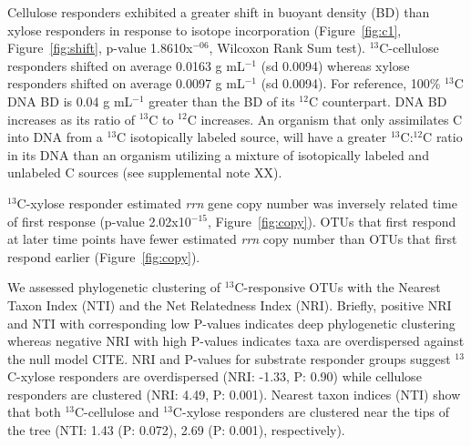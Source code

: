 Cellulose responders exhibited a greater shift in buoyant density (BD) than
xylose responders in response to isotope incorporation (Figure~\ref{fig:c1},
Figure~\ref{fig:shift}, p-value 1.8610x$^{-06}$, Wilcoxon Rank Sum test).
$^{13}$C-cellulose responders shifted on average
0.0163 g mL$^{-1}$ (sd 0.0094) whereas xylose responders shifted on average
0.0097 g mL$^{-1}$ (sd 0.0094). For reference, 100\% $^{13}$C DNA BD is 0.04
g mL$^{-1}$ greater than the BD of its $^{12}$C counterpart. DNA BD increases
as its ratio of $^{13}$C to $^{12}$C increases. An organism that only
assimilates C into DNA from a $^{13}$C isotopically labeled source, will have
a greater $^{13}$C:$^{12}$C ratio in its DNA than an organism utilizing
a mixture of isotopically labeled and unlabeled C sources (see supplemental
note XX). 

$^{13}$C-xylose responder estimated \textit{rrn} gene copy number was
inversely related time of first response (p-value 2.02x10$^{-15}$,
Figure~\ref{fig:copy}). OTUs that first respond at later time points have
fewer estimated \textit{rrn} copy number than OTUs that first respond
earlier (Figure~\ref{fig:copy}). 

We assessed phylogenetic clustering of $^{13}$C-responsive OTUs with the
Nearest Taxon Index (NTI) and the Net Relatedness Index (NRI). Briefly,
positive NRI and NTI with corresponding low P-values indicates deep
phylogenetic clustering whereas negative NRI with high P-values indicates taxa
are overdispersed against the null model CITE. NRI and P-values for substrate
responder groups suggest $^{13}$C-xylose responders are overdispersed (NRI:
-1.33, P: 0.90) while cellulose responders are clustered (NRI: 4.49, P: 0.001).
Nearest taxon indices (NTI) show that both $^{13}$C-cellulose and
$^{13}$C-xylose responders are clustered near the tips of the tree (NTI: 1.43
(P: 0.072), 2.69 (P: 0.001), respectively). 





